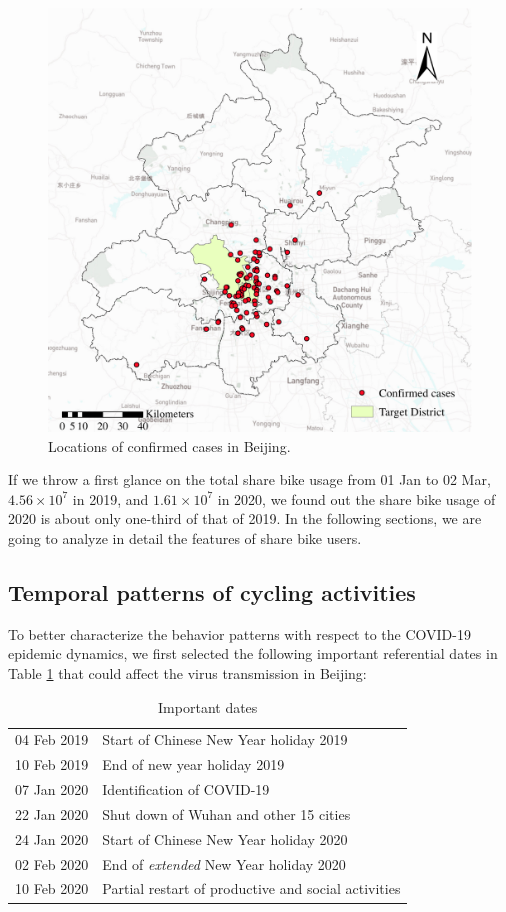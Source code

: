 \documentclass[ijgi,submit,moreauthors,pdftex]{Definitions/mdpi}
\begin{document}
\begin{figure}[ht]
    \centering
    \includegraphics[width=.5\textwidth]{Figures/Plot_location_confirmed_cases-eps-converted-to.pdf}
    \caption{Locations of confirmed cases in Beijing.}
    \label{fig:locations_of_confirmed_cases}
\end{figure}

If we throw a first glance on the total share bike usage from 01 Jan to 02 Mar, $4.56\times10^7$ in 2019, and $1.61\times10^7$ in 2020, we found out the share bike usage of 2020 is about only one-third of that of 2019.
In the following sections, we are going to analyze in detail the features of share bike users.

\subsection{Temporal patterns of cycling activities}
To better characterize the behavior patterns with respect to the COVID-19 epidemic dynamics, we first selected the following important referential dates in Table \ref{tab:important_dates} that could affect the virus transmission in Beijing: 

\begin{table}[ht]
    \centering
    \begin{tabular}{ll}
    04 Feb 2019 & Start of Chinese New Year holiday 2019\\
    10 Feb 2019 & End of new year holiday 2019\\
    07 Jan 2020 & Identification of COVID-19\\
    22 Jan 2020 & Shut down of Wuhan and other 15 cities\\
    24 Jan 2020 & Start of Chinese New Year holiday 2020\\
    02 Feb 2020 & End of \textit{extended} New Year holiday 2020\\
    10 Feb 2020 & Partial restart of productive and social activities
    \end{tabular}
    \caption{Important dates}
    \label{tab:important_dates}
\end{table}
\end{document}
